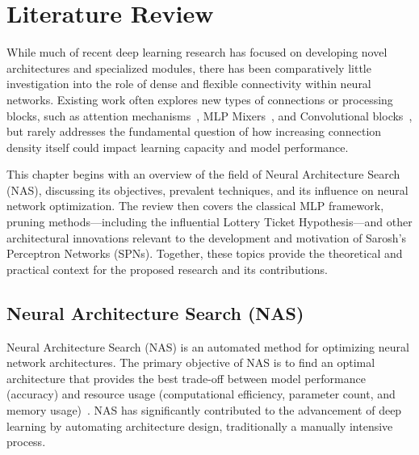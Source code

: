 
\chapter{Literature Review} %

\label{LiteratureReview} %


While much of recent deep learning research has focused on developing novel architectures and specialized modules, there has been comparatively little investigation into the role of dense and flexible connectivity within neural networks. Existing work often explores new types of connections or processing blocks, such as attention mechanisms~\cite{vaswani2017attention}, MLP Mixers~\cite{tolstikhin2021mlp}, and Convolutional blocks~\cite{krizhevsky2012imagenet}, but rarely addresses the fundamental question of how increasing connection density itself could impact learning capacity and model performance.

This chapter begins with an overview of the field of Neural Architecture Search (NAS), discussing its objectives, prevalent techniques, and its influence on neural network optimization. The review then covers the classical MLP framework, pruning methods—including the influential Lottery Ticket Hypothesis—and other architectural innovations relevant to the development and motivation of Sarosh’s Perceptron Networks (SPNs). Together, these topics provide the theoretical and practical context for the proposed research and its contributions.



\section{Neural Architecture Search (NAS)}

Neural Architecture Search (NAS) is an automated method for optimizing neural network architectures. The primary objective of NAS is to find an optimal architecture that provides the best trade-off between model performance (accuracy) and resource usage (computational efficiency, parameter count, and memory usage)~\cite{elsken2019neural}. NAS has significantly contributed to the advancement of deep learning by automating architecture design, traditionally a manually intensive process.

